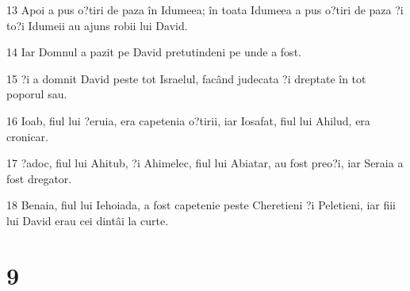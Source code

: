 \par 13 Apoi a pus o?tiri de paza în Idumeea; în toata Idumeea a pus o?tiri de paza ?i to?i Idumeii au ajuns robii lui David.
\par 14 Iar Domnul a pazit pe David pretutindeni pe unde a fost.
\par 15 ?i a domnit David peste tot Israelul, facând judecata ?i dreptate în tot poporul sau.
\par 16 Ioab, fiul lui ?eruia, era capetenia o?tirii, iar Iosafat, fiul lui Ahilud, era cronicar.
\par 17 ?adoc, fiul lui Ahitub, ?i Ahimelec, fiul lui Abiatar, au fost preo?i, iar Seraia a fost dregator.
\par 18 Benaia, fiul lui Iehoiada, a fost capetenie peste Cheretieni ?i Peletieni, iar fiii lui David erau cei dintâi la curte.

\chapter{9}

